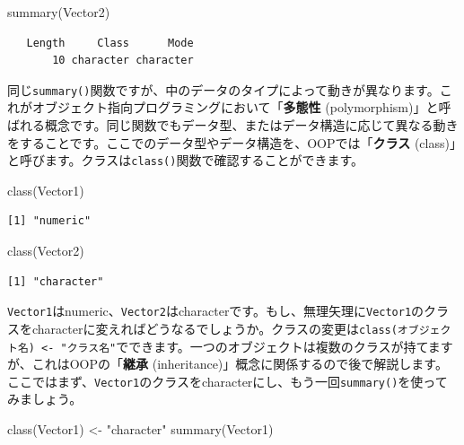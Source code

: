 \documentclass[
  a4paper,
  pandoc,
  ja=standard,
  jafont=haranoaji]{bxjsbook}
\newenvironment{Shaded}{\begin{snugshade}}{\end{snugshade}}
\newcommand{\FunctionTok}[1]{\textcolor[rgb]{0.28,0.35,0.67}{#1}}
\newcommand{\NormalTok}[1]{\textcolor[rgb]{0.00,0.48,0.65}{#1}}
\newcommand{\OtherTok}[1]{\textcolor[rgb]{0.00,0.48,0.65}{#1}}
\newcommand{\StringTok}[1]{\textcolor[rgb]{0.13,0.47,0.30}{#1}}
\begin{document}
\begin{Shaded}
\begin{Highlighting}[numbers=left,,]
\FunctionTok{summary}\NormalTok{(Vector2)}
\end{Highlighting}
\end{Shaded}

\begin{verbatim}
   Length     Class      Mode 
       10 character character 
\end{verbatim}

同じ\texttt{summary()}関数ですが、中のデータのタイプによって動きが異なります。これがオブジェクト指向プログラミングにおいて「\textbf{多態性}
(polymorphism)」と呼ばれる概念です。同じ関数でもデータ型、またはデータ構造に応じて異なる動きをすることです。ここでのデータ型やデータ構造を、OOPでは「\textbf{クラス}
(class)」と呼びます。クラスは\texttt{class()}関数で確認することができます。

\begin{Shaded}
\begin{Highlighting}[numbers=left,,]
\FunctionTok{class}\NormalTok{(Vector1)}
\end{Highlighting}
\end{Shaded}

\begin{verbatim}
[1] "numeric"
\end{verbatim}

\begin{Shaded}
\begin{Highlighting}[numbers=left,,]
\FunctionTok{class}\NormalTok{(Vector2)}
\end{Highlighting}
\end{Shaded}

\begin{verbatim}
[1] "character"
\end{verbatim}

\texttt{Vector1}はnumeric、\texttt{Vector2}はcharacterです。もし、無理矢理に\texttt{Vector1}のクラスをcharacterに変えればどうなるでしょうか。クラスの変更は\texttt{class(オブジェクト名)\ \textless{}-\ "クラス名"}でできます。一つのオブジェクトは複数のクラスが持てますが、これはOOPの「\textbf{継承}
(inheritance)」概念に関係するので後で解説します。ここではまず、\texttt{Vector1}のクラスをcharacterにし、もう一回\texttt{summary()}を使ってみましょう。

\begin{Shaded}
\begin{Highlighting}[numbers=left,,]
\FunctionTok{class}\NormalTok{(Vector1) }\OtherTok{\textless{}{-}} \StringTok{"character"}
\FunctionTok{summary}\NormalTok{(Vector1)}
\end{Highlighting}
\end{Shaded}
\end{document}
